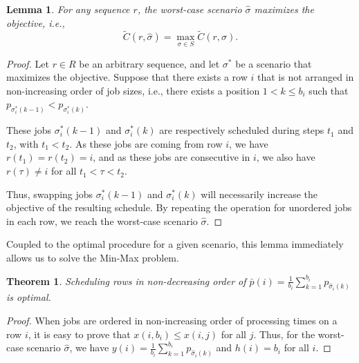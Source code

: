 \documentclass{article}
\newtheorem{theorem}{Theorem}
\newtheorem{definition}{Definition}
\newtheorem{lemma}{Lemma}
\begin{document}
\begin{lemma}
    For any sequence \(r\), the worst-case scenario \(\hat{\sigma}\) maximizes the objective, i.e.,
    \[
        \tilde{C}(r,\hat{\sigma})=\max_{\sigma\in S}\tilde{C}(r,\sigma).
    \]
\end{lemma}
\begin{proof}
    Let \(r\in R\) be an arbitrary sequence, and let \(\sigma^*\) be a scenario that maximizes the objective.
    Suppose that there exists a row \(i\) that is not arranged in non-increasing order of job sizes, i.e., there exists a position \(1<k\le b_i\) such that \(p_{\sigma^*_i(k-1)}<p_{\sigma^*_i(k)}\).

    These jobs \(\sigma^*_i(k-1)\) and \(\sigma^*_i(k)\) are respectively scheduled during steps \(t_1\) and \(t_2\), with \(t_1<t_2\).
    As these jobs are coming from row \(i\), we have \(r(t_1)=r(t_2)=i\), and as these jobs are consecutive in \(i\), we also have \(r(\tau)\ne i\) for all \(t_1<\tau<t_2\).

    Thus, swapping jobs \(\sigma^*_i(k-1)\) and \(\sigma^*_i(k)\) will necessarily increase the objective of the resulting schedule.
    By repeating the operation for unordered jobs in each row, we reach the worst-case scenario \(\hat{\sigma}\).
\end{proof}


Coupled to the optimal procedure for a given scenario, this lemma immediately allows us to solve the Min-Max problem.

\begin{theorem}
    Scheduling rows in non-decreasing order of \(\bar{p}(i)=\frac{1}{b_i} \sum_{k=1}^{b_i} p_{\hat{\sigma}_i(k)}\) is optimal.
\end{theorem}
\begin{proof}
    When jobs are ordered in non-increasing order of processing times on a row \(i\), it is easy to prove that \(x(i,b_i)\le x(i,j)\) for all \(j\).
    Thus, for the worst-case scenario \(\hat{\sigma}\), we have \(y(i)=\frac{1}{b_i} \sum_{k=1}^{b_i} p_{\hat{\sigma}_i(k)}\) and \(h(i)=b_i\) for all \(i\).
\end{proof}

\end{document}
